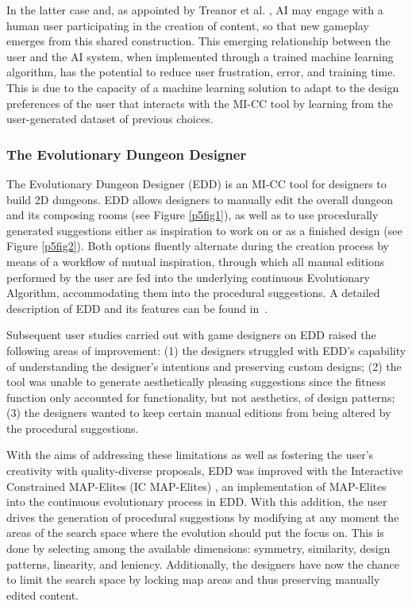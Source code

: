 In the latter case and, as appointed by Treanor et al. , AI may engage with a human user participating in the creation of content, so that new gameplay emerges from this shared construction. This emerging relationship between the user and the AI system, when implemented through a trained machine learning algorithm, has the potential to reduce user frustration, error, and training time. This is due to the capacity of a machine learning solution to adapt to the design preferences of the user that interacts with the MI-CC tool by learning from the user-generated dataset of previous choices.

\subsubsection{The Evolutionary Dungeon Designer}

The Evolutionary Dungeon Designer (EDD) is an MI-CC tool for designers to build 2D dungeons. EDD allows designers to manually edit the overall dungeon and its composing rooms (see Figure \ref{p5fig1}), as well as to use procedurally generated suggestions either as inspiration to work on or as a finished design (see Figure \ref{p5fig2}). Both options fluently alternate during the creation process by means of a workflow of mutual inspiration, through which all manual editions performed by the user are fed into the underlying continuous Evolutionary Algorithm, accommodating them into the procedural suggestions. A detailed description of EDD and its features can be found in~.

Subsequent user studies  carried out with game designers on EDD raised the following areas of improvement: (1) the designers struggled with EDD’s capability of understanding the designer’s intentions and preserving custom designs; (2) the tool was unable to generate aesthetically pleasing suggestions since the fitness function only accounted for functionality, but not aesthetics, of design patterns; (3) the designers wanted to keep certain manual editions from being altered by the procedural suggestions.  

With the aims of addressing these limitations as well as fostering the user's creativity with quality-diverse proposals, EDD was improved with the Interactive Constrained MAP-Elites (IC MAP-Elites) , an implementation of MAP-Elites into the continuous evolutionary process in EDD. With this addition, the user drives the generation of procedural suggestions by modifying at any moment the areas of the search space where the evolution should put the focus on. This is done by selecting among the available dimensions: symmetry, similarity, design patterns, linearity, and leniency. Additionally, the designers have now the chance to limit the search space by locking map areas and thus preserving manually edited content.

